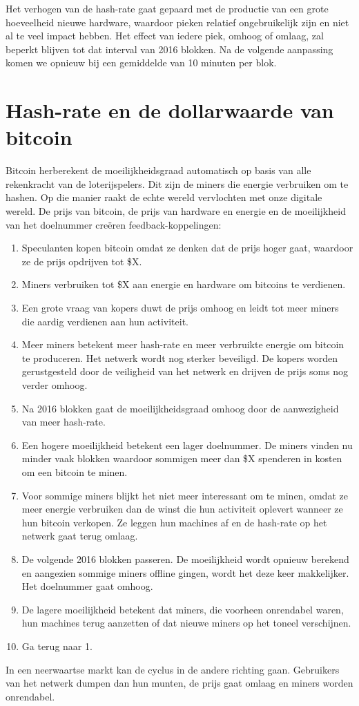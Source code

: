 Het verhogen van de hash-rate gaat gepaard met de productie van een grote hoeveelheid nieuwe hardware, waardoor pieken relatief ongebruikelijk zijn en niet al te veel impact hebben. Het effect van iedere piek, omhoog of omlaag, zal beperkt blijven tot dat interval van 2016 blokken. Na de volgende aanpassing komen we opnieuw bij een gemiddelde van 10 minuten per blok.

\section{Hash-rate en de dollarwaarde van bitcoin}
Bitcoin herberekent de moeilijkheidsgraad automatisch op basis van alle rekenkracht van de loterijspelers. Dit zijn de miners die energie verbruiken om te hashen. Op die manier raakt de echte wereld vervlochten met onze digitale wereld. De prijs van bitcoin, de prijs van hardware en energie en de moeilijkheid van het doelnummer creëren feedback-koppelingen:

\begin{enumerate}
\item Speculanten kopen bitcoin omdat ze denken dat de prijs hoger gaat, waardoor ze de prijs opdrijven tot \$X.
\item Miners verbruiken tot \$X aan energie en hardware om bitcoins te verdienen.
\item Een grote vraag van kopers duwt de prijs omhoog en leidt tot meer miners die aardig verdienen aan hun activiteit.
\item Meer miners betekent meer hash-rate en meer verbruikte energie om bitcoin te produceren. Het netwerk wordt nog sterker beveiligd. De kopers worden gerustgesteld door de veiligheid van het netwerk en drijven de prijs soms nog verder omhoog.
\item Na 2016 blokken gaat de moeilijkheidsgraad omhoog door de aanwezigheid van meer hash-rate.
\item Een hogere moeilijkheid betekent een lager doelnummer. De miners vinden nu minder vaak blokken waardoor sommigen meer dan \$X spenderen in kosten om een bitcoin te minen.
\item Voor sommige miners blijkt het niet meer interessant om te minen, omdat ze meer energie verbruiken dan de winst die hun activiteit oplevert wanneer ze hun bitcoin verkopen. Ze leggen hun machines af en de hash-rate op het netwerk gaat terug omlaag.
\item De volgende 2016 blokken passeren. De moeilijkheid wordt opnieuw berekend en aangezien sommige miners offline gingen, wordt het deze keer makkelijker. Het doelnummer gaat omhoog.
\item De lagere moeilijkheid betekent dat miners, die voorheen onrendabel waren, hun machines terug aanzetten of dat nieuwe miners op het toneel verschijnen.
\item Ga terug naar 1.
\end{enumerate}
In een neerwaartse markt kan de cyclus in de andere richting gaan. Gebruikers van het netwerk dumpen dan hun munten, de prijs gaat omlaag en miners worden onrendabel.

